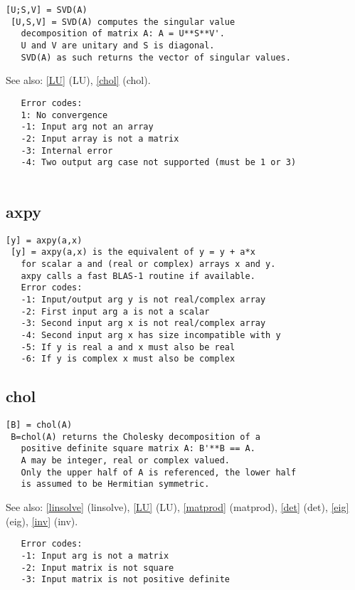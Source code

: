 \documentclass[a4paper]{article}
\begin{document}
\begin{tscreen}
\begin{verbatim}
[U;S,V] = SVD(A)
 [U,S,V] = SVD(A) computes the singular value
   decomposition of matrix A: A = U**S**V'.
   U and V are unitary and S is diagonal.
   SVD(A) as such returns the vector of singular values.
\end{verbatim}

See also: \ref{LU} {(LU)}, \ref{chol} {(chol)}.
\begin{verbatim}
   Error codes:
   1: No convergence
   -1: Input arg not an array
   -2: Input array is not a matrix
   -3: Internal error
   -4: Two output arg case not supported (must be 1 or 3)
   
\end{verbatim}
\end{tscreen}



\subsection{axpy\label{axpy}}

\begin{tscreen}
\begin{verbatim}
[y] = axpy(a,x)
 [y] = axpy(a,x) is the equivalent of y = y + a*x
   for scalar a and (real or complex) arrays x and y.
   axpy calls a fast BLAS-1 routine if available.
   Error codes:
   -1: Input/output arg y is not real/complex array
   -2: First input arg a is not a scalar
   -3: Second input arg x is not real/complex array
   -4: Second input arg x has size incompatible with y
   -5: If y is real a and x must also be real
   -6: If y is complex x must also be complex
\end{verbatim}
\end{tscreen}



\subsection{chol\label{chol}}

\begin{tscreen}
\begin{verbatim}
[B] = chol(A)
 B=chol(A) returns the Cholesky decomposition of a
   positive definite square matrix A: B'**B == A.
   A may be integer, real or complex valued.
   Only the upper half of A is referenced, the lower half
   is assumed to be Hermitian symmetric.
\end{verbatim}

See also: \ref{linsolve} {(linsolve)}, \ref{LU} {(LU)}, \ref{matprod} {(matprod)}, \ref{det} {(det)}, \ref{eig} {(eig)}, \ref{inv} {(inv)}.
\begin{verbatim}
   Error codes:
   -1: Input arg is not a matrix
   -2: Input matrix is not square
   -3: Input matrix is not positive definite 
\end{verbatim}
\end{tscreen}
\end{document}
